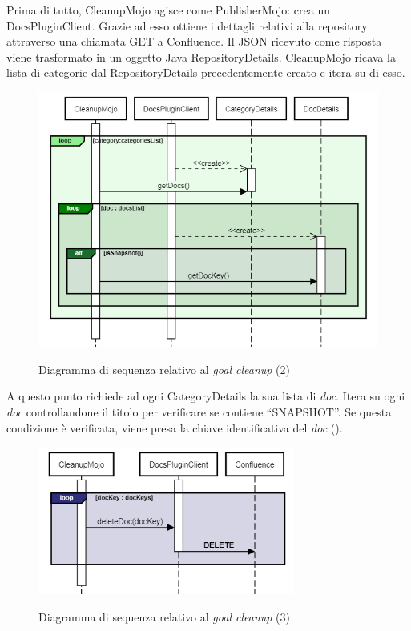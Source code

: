 Prima di tutto, CleanupMojo agisce come PublisherMojo: crea un DocsPluginClient.
Grazie ad esso ottiene i dettagli relativi alla repository attraverso una chiamata GET a Confluence.
Il JSON ricevuto come risposta viene trasformato in un oggetto Java RepositoryDetails.
CleanupMojo ricava la lista di categorie dal RepositoryDetails precedentemente creato e itera su di esso.

\begin{figure}[H]
    \centering
    \includegraphics[width=\textwidth]{immagini/CleanupSeq2.png}\\
    \caption{Diagramma di sequenza relativo al \emph{goal cleanup} (2)}
\end{figure}

A questo punto richiede ad ogni CategoryDetails la sua lista di \emph{doc}.
Itera su ogni \emph{doc} controllandone il titolo per verificare se contiene ``SNAPSHOT''.
Se questa condizione è verificata, viene presa la chiave identificativa del \emph{doc} ().

\begin{figure}[H]
    \centering
    \includegraphics[width=0.75\textwidth]{immagini/CleanupSeq3.png}\\
    \caption{Diagramma di sequenza relativo al \emph{goal cleanup} (3)}
\end{figure}

